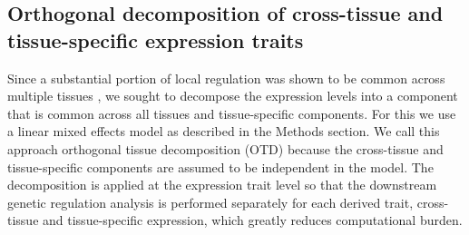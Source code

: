 \documentclass[10pt,letterpaper]{article}
\begin{document}


\subsection*{Orthogonal decomposition of cross-tissue and tissue-specific expression traits}

Since a substantial portion of local regulation was shown to be common across multiple tissues \cite{Ardlie_2015}, we sought to decompose the expression levels into a component that is common across all tissues and tissue-specific components. For this we use a linear mixed effects model as described in the Methods section. We call this approach orthogonal tissue decomposition (OTD) because the cross-tissue and tissue-specific components are assumed to be independent in the model. The decomposition is applied at the expression trait level so that the downstream genetic regulation analysis is performed separately for each derived trait, cross-tissue and tissue-specific expression, which greatly reduces computational burden. 
\end{document}
